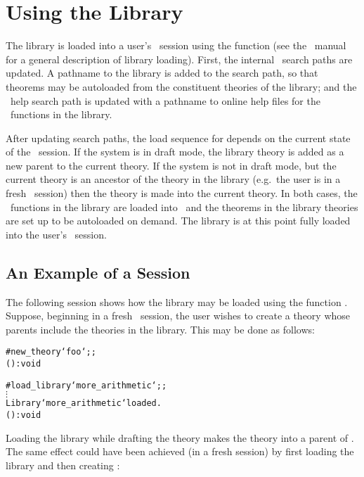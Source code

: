\section{Using the Library}

The  library is loaded into a user's \HOL\ session using the
function  (see the \HOL\ manual for a general description of
library loading). 
First, the internal \HOL\ search paths are updated.  A pathname to
the  library is added to the search path, so that theorems may be
autoloaded from the constituent theories of the library; and the \HOL\
help search path is updated with a pathname to online help files for the \ML\
functions in the library. 

After updating search paths, the load sequence for  depends on the
current state of the \HOL\ session. If the system is in draft mode, the library
theory  is added as a new parent to the current theory.  If the
system is not in draft mode, but the current theory is an ancestor of the
\ml{more\_arithmetic} theory in the library (e.g.\ the user is in a fresh \HOL\ session)
then the  theory is made into the current theory.  In both cases,
the \ML\ functions in the library are loaded into \HOL\, and the theorems in
the library theories are set up to be autoloaded on demand.  The \ml{more\_arithmetic}
library is at this point fully loaded into the user's \HOL\ session.

\subsection{An Example of a Session}

The following session shows how the  library may be
loaded using the function
\ml{load\_library}. Suppose, beginning in a fresh \HOL\ session, the user
wishes to create a theory  whose parents include the theories in the
\ml{more\_arithmetic} library. This may be done as follows:

\setcounter{sessioncount}{1}
\begin{session}\begin{alltt}
#new_theory `foo`;;
() : void

#load_library `more\_arithmetic`;;
  \(\vdots\)
Library `more\_arithmetic` loaded.
() : void
\end{alltt}\end{session}

\noindent Loading the library while drafting the theory  makes the
theory  into a parent of .  The same effect could
have been achieved (in a fresh session) by first loading the library and then
creating \ml{foo}:

